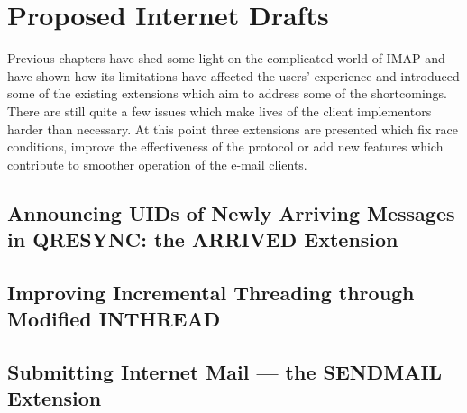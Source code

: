 \documentclass[trojita]{subfiles}
\begin{document}
\chapter{Proposed Internet Drafts}

Previous chapters have shed some light on the complicated world of IMAP and have shown how its limitations have
affected the users' experience and introduced some of the existing extensions which aim to address some of the
shortcomings.  There are still quite a few issues which make lives of the client implementors harder than necessary.  At
this point three extensions are presented which fix race conditions, improve the effectiveness of the protocol or add new
features which contribute to smoother operation of the e-mail clients.

\section{Announcing UIDs of Newly Arriving Messages in QRESYNC: the ARRIVED Extension}
\label{sec:draft-arrived}

\section{Improving Incremental Threading through Modified INTHREAD}
\label{sec:draft-inthread-ext}

\section{Submitting Internet Mail --- the SENDMAIL Extension}
\label{sec:draft-sendmail}
\end{document}
